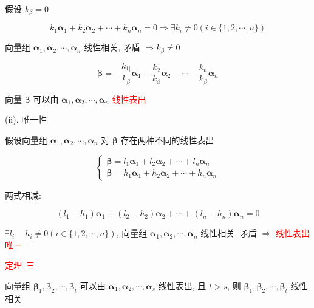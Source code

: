 \begin{theorem}[判别线性相关性的七大定理]
\begin{anymark}[证明]
		假设 $k_{\beta}=0$  
		
		$$k_{1}\boldsymbol{\alpha}_{1} + k_{2}\boldsymbol{\alpha}_{2} + \cdots + k_{n}\boldsymbol{\alpha}_{n} = 0\Rightarrow \exists k_{i}\neq 0 (i\in \{1,2,\cdots,n\})$$
		
		向量组 $\boldsymbol{\alpha}_{1}, \boldsymbol{\alpha}_{2}, \cdots, \boldsymbol{\alpha}_{n}$ 线性相关, 矛盾 $\Rightarrow k_{\beta} \neq 0$
		
		$$\boldsymbol{\beta} = -\dfrac{k_{1]}}{k_{\beta}} \boldsymbol{\alpha}_{1} - \dfrac{k_{2}}{k_{\beta}} \boldsymbol{\alpha}_{2} - \cdots - \dfrac{k_{n}}{k_{\beta}}\boldsymbol{\alpha}_{n}$$

		向量 $\boldsymbol{\beta}$ 可以由 $\boldsymbol{\alpha}_{1}, \boldsymbol{\alpha}_{2}, \cdots, \boldsymbol{\alpha}_{n}$ \textcolor{red}{线性表出}
		
		(ii). 唯一性
		
		假设向量组 $\boldsymbol{\alpha}_{1}, \boldsymbol{\alpha}_{2}, \cdots, \boldsymbol{\alpha}_{n}$ 对 $\boldsymbol{\beta}$ 存在两种不同的线性表出  
		
		$$\begin{cases}
			\boldsymbol{\beta} = l_{1}\boldsymbol{\alpha}_{1} + l_{2}\boldsymbol{\alpha}_{2} + \cdots + l_{n}\boldsymbol{\alpha}_{n}\\
			\boldsymbol{\beta} = h_{1}\boldsymbol{\alpha}_{1} + h_{2}\boldsymbol{\alpha}_{2} + \cdots + h_{n}\boldsymbol{\alpha}_{n}
		\end{cases}$$

		两式相减:  

		$$(l_{1}-h_{1})\boldsymbol{\alpha}_{1} + (l_{2}-h_{2})\boldsymbol{\alpha}_{2} + \cdots + (l_{n}-h_{n})\boldsymbol{\alpha}_{n}=0$$

		$\exists l_{i}-h_{i}\neq 0(i\in\{1,2,\cdots,n\})$, 向量组 $\boldsymbol{\alpha}_{1},\boldsymbol{\alpha}_{2}, \cdots, \boldsymbol{\alpha}_{n}$ 线性相关, 矛盾 $\Rightarrow$ \textcolor{red}{线性表出唯一}
	\end{anymark}

	\textcolor{red}{定理\ 三}
	
	向量组 $\boldsymbol{\beta}_{1}, \boldsymbol{\beta}_{2},\cdots, \boldsymbol{\beta}_{t}$ 可以由 $\boldsymbol{\alpha}_{1},\boldsymbol{\alpha}_{2}, \cdots, \boldsymbol{\alpha}_{s}$ 线性表出, 且 $t > s$, 则 $\boldsymbol{\beta}_{1},\boldsymbol{\beta}_{2},\cdots,\boldsymbol{\beta}_{t}$ 线性相关
	
	\begin{anymark}[证明]
		

\end{anymark}
\end{theorem}
